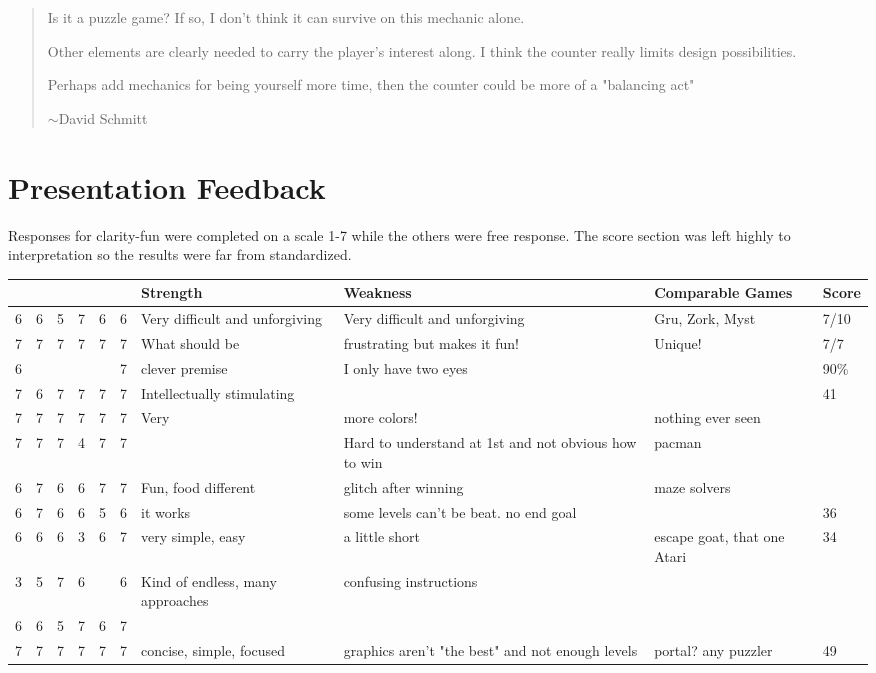 \documentclass{scrreprt}
\newcommand{\newtilde}{$\sim$}
\newcommand\tab[1][1cm]{\hspace*{#1}}
\newcommand*\rot{\rotatebox{90}}
\begin{document}
		\begin{quote}
			Is it a puzzle game? If so, I don't think it can survive on this mechanic alone. 
			
			\tab\tab Other elements are clearly needed to carry the player's interest along. I think the counter really limits design possibilities.
			
			Perhaps add mechanics for being yourself more time, then the counter could be more of a "balancing act"
			
			\hfill\newtilde David Schmitt\\
		\end{quote}
	
	\chapter{Presentation Feedback}\label{chp:pres}
		Responses for clarity-fun were completed on a scale 1-7 while the others were free response. The score section was left highly to interpretation so the results were far from standardized. 
		\begin{center}
		\begin{tabularx}{\textwidth}{ |c|c|c|c|c|c|X|X|X|X| }
			\hline
			\rot{Clarity} & \rot{Flow} & \rot{Balance} & \rot{Length} & \rot{Integration \ } & \rot{Fun} & Strength & Weakness & Comparable Games & Score \\\hline
			6 & 6 & 5 & 7 & 6 & 6 & Very difficult and unforgiving & Very difficult and unforgiving & Gru, Zork, Myst & 7/10 \\\hline
			7 & 7 & 7 & 7 & 7 & 7 & What should be & frustrating but makes it fun! & Unique! & 7/7 \\\hline
			6 & & & & & 7 & clever premise & I only have two eyes & & 90\% \\\hline
			7 & 6 & 7 & 7 & 7 & 7 & Intellectually stimulating & & & 41 \\\hline
			7 & 7 & 7 & 7 & 7 & 7 & Very \Ovalbox{fun} & more colors! & nothing ever seen & \\\hline %
			7 & 7 & 7 & 4 & 7 & 7 & & Hard to understand at 1st and not obvious how to win & pacman & \\\hline
			6 & 7 & 6 & 6 & 7 & 7 & Fun, food different & glitch after winning & maze solvers & \\\hline
			6 & 7 & 6 & 6 & 5 & 6 & it works & some levels can't be beat. no end goal & & 36 \\\hline
			6 & 6 & 6 & 3 & 6 & 7 & very simple, easy & a little short & escape goat, that one Atari & 34 \\\hline
			3 & 5 & 7 & 6 & & 6 & Kind of endless, many approaches & confusing instructions & & \\\hline
			6 & 6 & 5 & 7 & 6 & 7 & & & & \\\hline
			7 & 7 & 7 & 7 & 7 & 7 & concise, simple, focused & graphics aren't "the best" and not enough levels & portal? any puzzler & 49 \\\hline
		\end{tabularx}
		\end{center}
	
\end{document}
